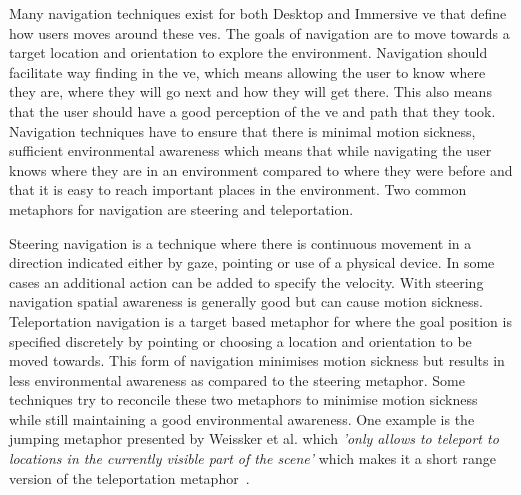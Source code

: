 %
%
%
%
%
%
\label{Chapter:Introduction}
Many navigation techniques exist for both Desktop and Immersive \acrfull{ve} that define how users moves around these \acrshort{ve}s. The goals of navigation are to move towards a target location and orientation to explore the environment. Navigation should facilitate way finding in the \acrshort{ve}, which means allowing the user to know where they are, where they will go next and how they will get there. This also means that the user should have a good perception of the \acrshort{ve} and path that they took. Navigation techniques have to ensure that there is minimal motion sickness, sufficient environmental awareness which means that while navigating the user knows where they are in an environment compared to where they were before and that it is easy to reach important places in the environment. Two common metaphors for navigation are steering and teleportation.

Steering navigation is a technique where there is continuous movement in a direction indicated either by gaze, pointing or use of a physical device. In some cases an additional action can be added to specify the velocity. With steering navigation spatial awareness is generally good but can cause motion sickness. Teleportation navigation is a target based metaphor for where the goal position is specified discretely by pointing or choosing a location and orientation to be moved towards. This form of navigation minimises motion sickness but results in less environmental awareness as compared to the steering metaphor. Some techniques try to reconcile these two metaphors to minimise motion sickness while still maintaining a good environmental awareness. One example is the jumping metaphor presented by Weissker et al. which \textit{'only allows to teleport to locations in the currently visible part of the scene'} which makes it a short range version of the teleportation metaphor~\cite{Weissker2018}. 

